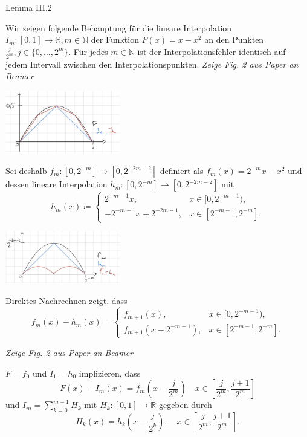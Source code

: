 \documentclass[12pt]{article}
\newcommand{\N}{\mathbb{N}} %
\newcommand{\R}{\mathbb{R}} %
\renewcommand{\set}[1]{\{#1\}}
\begin{document}
{\Large Lemma III.2}

Wir zeigen folgende Behauptung für die lineare Interpolation 
\(I_m : [0,1] \rightarrow \R, m\in \N\) der Funktion 
\(F(x) = x - x^2\) an den Punkten \(\frac{j}{2^m}, j \in \set{0,\ldots, 2^m}\).
Für jedes \(m\in\N\) ist der Interpolationsfehler identisch auf jedem Intervall zwischen 
den Interpolationspunkten. \textit{Zeige Fig. 2 aus Paper an Beamer}

\begin{center}
    \includegraphics[width=5cm]{images/iii2_1.jpg} %
\end{center}

Sei deshalb \(f_m: [0,2^{-m}] \rightarrow [0,2^{-2m-2}]\) definiert als \(f_m(x) = 2^{-m}x - x^2\)
und dessen lineare Interpolation \(h_m: [0,2^{-m}] \rightarrow [0,2^{-2m-2}]\) mit 
\[ h_m(x) \coloneqq \begin{cases}
    2^{-m-1}x, &x\in [0,2^{-m-1}), \\
    -2^{-m-1}x + 2^{-2m-1}, &x \in [2^{-m-1}, 2^{-m}].
\end{cases} \]

\begin{center}
    \includegraphics[width=5cm]{images/iii2_2.jpg} %
\end{center}

Direktes Nachrechnen zeigt, dass 
\[ f_m(x) - h_m(x) = \begin{cases}
    f_{m+1}(x), &x\in [0, 2^{-m-1}), \\
    f_{m+1}(x - 2^{-m-1}), &x \in [2^{-m-1}, 2^{-m}].
\end{cases} \]

\textit{Zeige Fig. 2 aus Paper an Beamer}

\(F = f_0\) und \(I_1 = h_0\) implizieren, dass 
\[ F(x) - I_m(x) = f_m(x - \frac{j}{2^m}) \quad x\in [\frac{j}{2^m}, \frac{j+1}{2^m}] \]
und \(I_m = \sum_{k=0}^{m-1} H_k\) mit \(H_k : [0,1]\rightarrow \R\) gegeben durch 
\[ H_k(x) = h_k(x - \frac{j}{2^k}), \quad x\in [\frac{j}{2^m}, \frac{j+1}{2^m}]. \]
\end{document}
